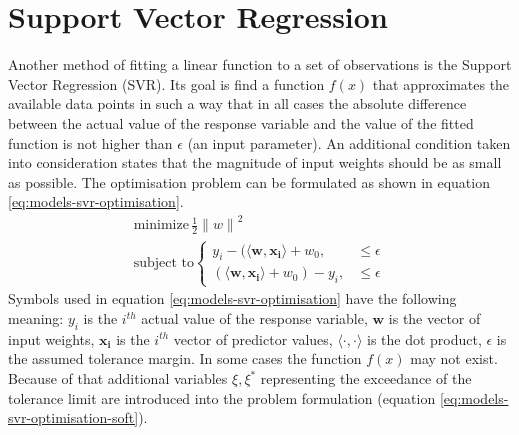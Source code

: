\section{Support Vector Regression}
Another method of fitting a linear function to a set of observations is the Support Vector Regression (SVR). Its goal is find a function $f(x)$ that approximates the available data points in such a way that in all cases the absolute difference between the actual value of the response variable and the value of the fitted function is not higher than $\epsilon$ (an input parameter). An additional condition taken into consideration states that the magnitude of input weights should be as small as possible. The optimisation problem can be formulated as shown in equation \ref{eq:models-svr-optimisation}.
\begin{equation}\label{eq:models-svr-optimisation}
\begin{gathered}
    \text{minimize}\, \frac{1}{2} {\lVert {w} \rVert}^2 \\
    \text{subject to}
    \begin{cases}
        y_i - (\langle \bm{w}, \bm{x_i} \rangle + w_0, & \leq \epsilon \\
        (\langle \bm{w}, \bm{x_i} \rangle + w_0) - y_i, & \leq \epsilon
    \end{cases}
\end{gathered}
\end{equation}
Symbols used in equation \ref{eq:models-svr-optimisation} have the following meaning: $y_i$ is the $i^{th}$ actual value of the response variable, $\bm{w}$ is the vector of input weights, $\bm{x_i}$ is the $i^{th}$ vector of predictor values, $\langle \cdot, \cdot \rangle$ is the dot product, $\epsilon$ is the assumed tolerance margin. 
In some cases the function $f(x)$ may not exist. Because of that additional variables $\xi, {\xi}^*$ representing the exceedance of the tolerance limit are introduced into the problem formulation (equation \ref{eq:models-svr-optimisation-soft}).

